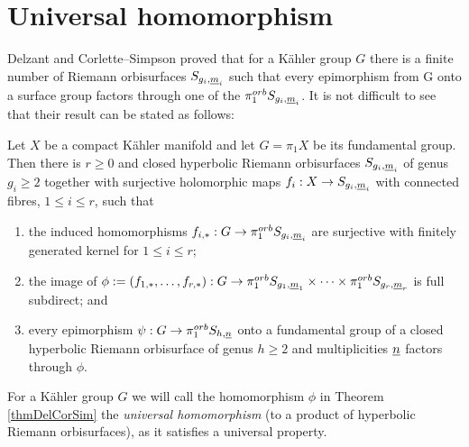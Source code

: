 \section{Universal homomorphism}
\label{secConsGens}

Delzant \cite[Theorem 2]{Del-08} and Corlette--Simpson \cite[Proposition 2.8]{CorSim-08} proved that for a K\"ahler group $G$ there is a finite number of Riemann orbisurfaces $S_{g_i,{\underline{m}}_i}$ such that every epimorphism from G onto a surface group factors through one of the $\pi_1 ^{orb} S_{g_i,{\underline{m}}_i}$. It is not difficult to see that their result can be stated as follows:

\begin{theorem}
 Let $X$ be a compact K\"ahler manifold and let $G=\pi_1 X$ be its fundamental group. Then there is $r\geq 0$ and closed hyperbolic Riemann orbisurfaces $S_{g_i,{\underline{m}}_i}$ of genus $g_i \geq 2$ together with surjective holomorphic maps $f_i : X \rightarrow S_{g_i,{\underline{m}}_i}$ with connected fibres, $1\leq i \leq r$, such that
 \begin{enumerate}
  \item the induced homomorphisms $f_{i,\ast} : G \rightarrow \pi_1 ^{orb} S_{g_i,{\underline{m}}_i}$ are surjective with finitely generated kernel for $1\leq i \leq r$;
  \item the image of $\phi:= (f_{1,\ast}, \dots, f_{r,\ast}): G \rightarrow  \pi_1^{orb} S_{g_1, {\underline{m}}_1} \times \dots \times \pi_1^{orb} S_{g_r,{\underline{m}}_r}$ is full subdirect; and
  \item every epimorphism $\psi: G\rightarrow \pi_1^{orb} S_{h,{\underline{n}}}$ onto a fundamental group of a closed hyperbolic Riemann orbisurface of genus $h\geq 2$ and multiplicities ${\underline{n}}$ factors through $\phi$.
 \end{enumerate}
 \label{thmDelCorSim}
\end{theorem}

For a K\"ahler group $G$ we will call the homomorphism $\phi$ in Theorem \ref{thmDelCorSim} the \textit{universal homomorphism} (to a product of hyperbolic Riemann orbisurfaces), as it satisfies a universal property. 

